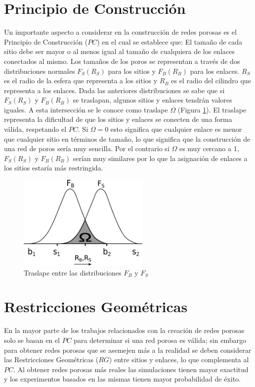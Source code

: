 \section{Principio de Construcción}
\label{sec:mpc}
Un importante aspecto a considerar en la construcción de redes porosas es el Principio de Construcción ($PC$) en el cual se establece que: El tamaño de cada sitio debe ser mayor o al menos igual al tamaño de cualquiera de los enlaces conectados al mismo. Los tamaños de los poros se representan a través de dos distribuciones normales $F_S(R_S)$ para los sitios y $F_B(R_B)$ para los enlaces. $R_S$ es el radio de la esfera que representa a los sitios y $R_B$ es el radio del cilindro que representa a los enlaces. Dada las anteriores distribuciones se sabe que si $F_S(R_S)$ y $F_B(R_B)$ se traslapan, algunos sitios y enlaces tendrán valores iguales. A esta intersección se le conoce como traslape $\Omega$ (Figura \ref{fig:overlap}). El traslape representa la dificultad de que los sitios y enlaces se conecten de una forma válida, respetando el $PC$. Si $\Omega=0$ esto significa que cualquier enlace es menor que cualquier sitio en términos de tamaño, lo que significa que la construcción de una red de poros sería muy sencilla. Por el contrario si $\Omega$ es muy cercano a 1, $F_S(R_S)$ y $F_B(R_B)$ serían muy similares por lo que la asignación de enlaces a los sitios estaría más restringida.\\

\begin{figure}[hbtp]
\centering
\includegraphics[width=2.5in]{img/traslape.pdf}
\caption{Traslape entre las distribuciones \textit{$F_B$} y $F_S$}
\label{fig:overlap}
\end{figure}

\section{Restricciones Geométricas}
\label{sec:mgr}

En la mayor parte de los trabajos relacionados con la creación de redes porosas solo se basan en el $PC$ para determinar si una red porosa es válida; sin embargo para obtener redes porosas que se asemejen más a la realidad se deben considerar las Restricciones Geométricas ($RG$) entre sitios y enlaces, lo que complementa al $PC$. Al obtener redes porosas más reales las simulaciones tienen mayor exactitud y los experimentos basados en las mismas tienen mayor probabilidad de éxito.\\

